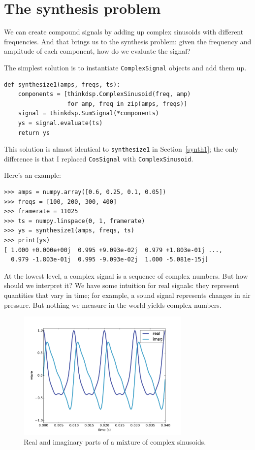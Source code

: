 \documentclass[12pt]{book}
\begin{document}
\section{The synthesis problem}

We can create compound signals by adding up complex
sinusoids with different frequencies.  And that brings us
to the synthesis problem: given the frequency and amplitude of
each component, how do we evaluate the signal?

The simplest solution is to instantiate {\tt ComplexSignal}
objects and add them up.

\begin{verbatim}
def synthesize1(amps, freqs, ts):
    components = [thinkdsp.ComplexSinusoid(freq, amp)
                  for amp, freq in zip(amps, freqs)]
    signal = thinkdsp.SumSignal(*components)
    ys = signal.evaluate(ts)
    return ys
\end{verbatim}

This solution is almost identical to {\tt synthesize1} in
Section~\ref{synth1}; the only difference is that I replaced
{\tt CosSignal} with {\tt ComplexSinusoid}.

Here's an example:

\begin{verbatim}
>>> amps = numpy.array([0.6, 0.25, 0.1, 0.05])
>>> freqs = [100, 200, 300, 400]
>>> framerate = 11025
>>> ts = numpy.linspace(0, 1, framerate)
>>> ys = synthesize1(amps, freqs, ts)
>>> print(ys)
[ 1.000 +0.000e+00j  0.995 +9.093e-02j  0.979 +1.803e-01j ...,
  0.979 -1.803e-01j  0.995 -9.093e-02j  1.000 -5.081e-15j]
\end{verbatim}

At the lowest level, a complex signal is a sequence of complex
numbers.  But how should we interpret it?  We have some intuition for
real signals: they represent quantities that vary in time; for
example, a sound signal represents changes in air pressure.
But nothing we measure in the world yields complex numbers.

\begin{figure}
\centerline{\includegraphics[height=2.5in]{figs/dft1.pdf}}
\caption{Real and imaginary parts of a mixture of complex sinusoids.}
\label{fig.dft1}
\end{figure}
\end{document}
